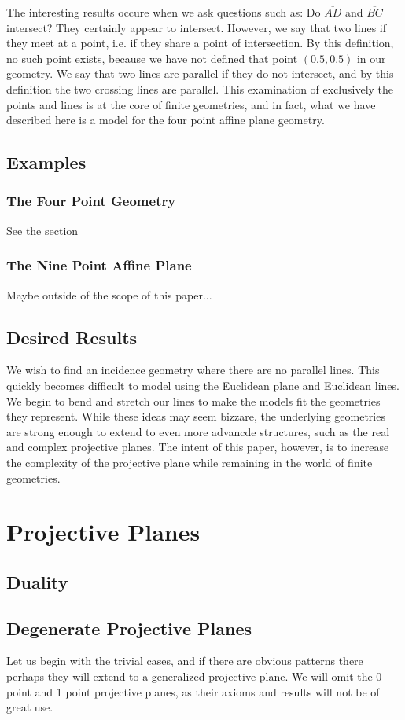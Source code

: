 \documentclass{article}
\begin{document}
The interesting results occure when we ask questions such as: Do $\overline{AD}$ and $\overline{BC}$ intersect? They certainly appear to intersect. However, we say that two lines if they meet at a point, i.e. if they share a point of intersection. By this definition, no such point exists, because we have not defined that point $(0.5,0.5)$ in our geometry. We say that two lines are parallel if they do not intersect, and by this definition the two crossing lines are parallel. This examination of exclusively the points and lines is at the core of finite geometries, and in fact, what we have described here is a model for the four point affine plane geometry.

\subsection{Examples}
\subsubsection{The Four Point Geometry}
See the section 
\subsubsection{The Nine Point Affine Plane}
Maybe outside of the scope of this paper...
\subsection{Desired Results}
We wish to find an incidence geometry where there are no parallel lines. This quickly becomes difficult to model using the Euclidean plane and Euclidean lines. We begin to bend and stretch our lines to make the models fit the geometries they represent. While these ideas may seem bizzare, the underlying geometries are strong enough to extend to even more advancde structures, such as the real and complex projective planes. The intent of this paper, however, is to increase the complexity of the projective plane while remaining in the world of finite geometries. 

\section{Projective Planes}

\subsection{Duality}
\subsection{Degenerate Projective Planes}
Let us begin with the trivial cases, and if there are obvious patterns there perhaps they will extend to a generalized projective plane. We will omit the 0 point and 1 point projective planes, as their axioms and results will not be of great use.
\end{document}
